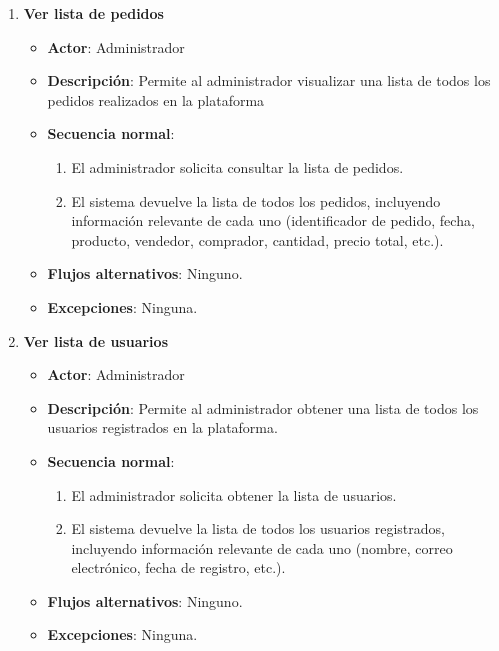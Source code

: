 \begin{enumerate}[label=UC-\protect\twodigits{\arabic*}:, align=left, leftmargin=*]	

\item \textbf{Ver lista de pedidos}
\begin{itemize}
\item \textbf{Actor}: Administrador
\item \textbf{Descripción}: Permite al administrador visualizar una lista de todos los pedidos realizados en la plataforma
\item \textbf{Secuencia normal}:
\begin{enumerate}[label={\arabic*}:]
\item El administrador solicita consultar la lista de pedidos.
\item El sistema devuelve la lista de todos los pedidos, incluyendo información relevante de cada uno (identificador de pedido, fecha, producto, vendedor, comprador, cantidad, precio total, etc.).
\end{enumerate}
\item \textbf{Flujos alternativos}: Ninguno.
\item \textbf{Excepciones}: Ninguna.
\end{itemize}

\item \textbf{Ver lista de usuarios}
\begin{itemize}
\item \textbf{Actor}: Administrador
\item \textbf{Descripción}: Permite al administrador obtener una lista de todos los usuarios registrados en la plataforma.
\item \textbf{Secuencia normal}:
\begin{enumerate}[label={\arabic*}:]
\item El administrador solicita obtener la lista de usuarios.
\item El sistema devuelve la lista de todos los usuarios registrados, incluyendo información relevante de cada uno (nombre, correo electrónico, fecha de registro, etc.).
\end{enumerate}
\item \textbf{Flujos alternativos}: Ninguno.
\item \textbf{Excepciones}: Ninguna.
\end{itemize}


\end{enumerate}
